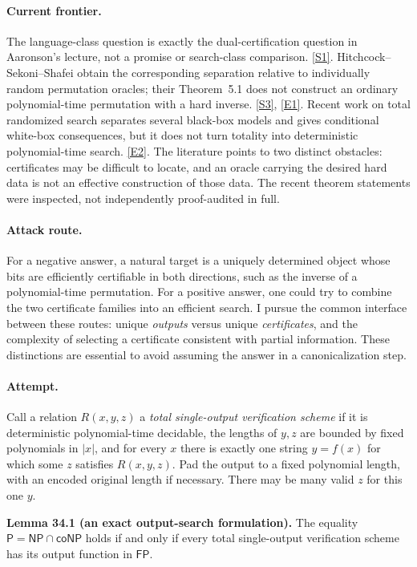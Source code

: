 \documentclass[11pt,a4paper]{article}
\newcommand{\sref}[2]{\hyperlink{source:#1:#2}{[S#2]}}
\newcommand{\eref}[2]{\hyperlink{extra:#1:#2}{[E#2]}}
\numberwithin{equation}{section}
\begin{document}
\paragraph{Current frontier.}
The language-class question is exactly the dual-certification question in
Aaronson's lecture, not a promise or search-class comparison.
\sref{30006687}{1}. Hitchcock--Sekoni--Shafei obtain the corresponding separation
relative to individually random permutation oracles; their Theorem~5.1 does
not construct an ordinary polynomial-time permutation with a hard inverse.
\sref{30006687}{3}, \eref{30006687}{1}. Recent work on total randomized search separates
several black-box models and gives conditional white-box consequences, but
it does not turn totality into deterministic polynomial-time search.
\eref{30006687}{2}. The literature points to two distinct obstacles: certificates
may be difficult to locate, and an oracle carrying the desired hard data is
not an effective construction of those data. The recent theorem statements
were inspected, not independently proof-audited in full.

\paragraph{Attack route.}
For a negative answer, a natural target is a uniquely determined object whose
bits are efficiently certifiable in both directions, such as the inverse of
a polynomial-time permutation. For a positive answer, one could try to
combine the two certificate families into an efficient search. I pursue the
common interface between these routes: unique \emph{outputs} versus unique
\emph{certificates}, and the complexity of selecting a certificate consistent
with partial information. These distinctions are essential to avoid assuming
the answer in a canonicalization step.

\paragraph{Attempt.}
Call a relation $R(x,y,z)$ a \emph{total single-output verification scheme}
if it is deterministic polynomial-time decidable, the lengths of $y,z$ are
bounded by fixed polynomials in $|x|$, and for every $x$ there is exactly one
string $y=f(x)$ for which some $z$ satisfies $R(x,y,z)$. Pad the output to a
fixed polynomial length, with an encoded original length if necessary.
There may be many valid $z$ for this one $y$.

\textbf{Lemma 34.1 (an exact output-search formulation).}
The equality $\mathsf P=\mathsf{NP}\cap\mathsf{coNP}$ holds if and only if
every total single-output verification scheme has its output function in
$\mathsf{FP}$.
\end{document}
